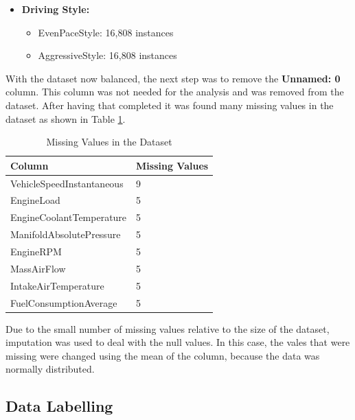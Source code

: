 \documentclass[10pt,journal,compsoc]{IEEEtran}
\begin{document}
\begin{itemize}
    \item \textbf{Driving Style:}
    \begin{itemize}
        \item EvenPaceStyle: 16,808 instances
        \item AggressiveStyle: 16,808 instances
    \end{itemize}
\end{itemize}

With the dataset now balanced, the next step was to remove the \textbf{Unnamed: 0} column. This column was not needed for the analysis and was removed from the dataset.
After having that completed it was found many missing values in the dataset as shown in Table \ref{table:data_values}.

\begin{table}[h]
    \centering    
    \begin{tabular}{|l|l|}
    \hline
    \textbf{Column}                   & \textbf{Missing Values} \\ \hline
    VehicleSpeedInstantaneous         & 9                       \\ \hline
    EngineLoad                        & 5                       \\ \hline
    EngineCoolantTemperature          & 5                       \\ \hline
    ManifoldAbsolutePressure          & 5                       \\ \hline
    EngineRPM                         & 5                       \\ \hline
    MassAirFlow                       & 5                       \\ \hline
    IntakeAirTemperature              & 5                       \\ \hline
    FuelConsumptionAverage            & 5                       \\ \hline
    \end{tabular}
    \caption{Missing Values in the Dataset}
    \label{table:data_values}
\end{table}


Due to the small number of missing values relative to the size of the dataset, imputation was used to deal with the null values. In this case, the vales that were missing were
changed using the mean of the column, because the data was normally distributed.


\subsection{Data Labelling}
\end{document}
